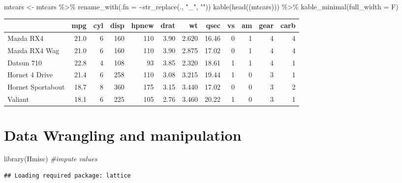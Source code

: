\documentclass[
]{book}
\newenvironment{Shaded}{\begin{snugshade}}{\end{snugshade}}
\newcommand{\AttributeTok}[1]{\textcolor[rgb]{0.77,0.63,0.00}{#1}}
\newcommand{\CommentTok}[1]{\textcolor[rgb]{0.56,0.35,0.01}{\textit{#1}}}
\newcommand{\FunctionTok}[1]{\textcolor[rgb]{0.00,0.00,0.00}{#1}}
\newcommand{\NormalTok}[1]{#1}
\newcommand{\OtherTok}[1]{\textcolor[rgb]{0.56,0.35,0.01}{#1}}
\newcommand{\SpecialCharTok}[1]{\textcolor[rgb]{0.00,0.00,0.00}{#1}}
\newcommand{\StringTok}[1]{\textcolor[rgb]{0.31,0.60,0.02}{#1}}
\begin{document}
\begin{Shaded}
\begin{Highlighting}[]
\NormalTok{mtcars }\OtherTok{\textless{}{-}}\NormalTok{ mtcars }\SpecialCharTok{\%\textgreater{}\%} \FunctionTok{rename\_with}\NormalTok{(}\AttributeTok{.fn =} \SpecialCharTok{\textasciitilde{}}\FunctionTok{str\_replace}\NormalTok{(., }\StringTok{"\_"}\NormalTok{, }\StringTok{""}\NormalTok{))}
\FunctionTok{kable}\NormalTok{(}\FunctionTok{head}\NormalTok{((mtcars))) }\SpecialCharTok{\%\textgreater{}\%} \FunctionTok{kable\_minimal}\NormalTok{(}\AttributeTok{full\_width =}\NormalTok{ F)}
\end{Highlighting}
\end{Shaded}

\begin{table}
\centering
\begin{tabular}{l|r|r|r|r|r|r|r|r|r|r|r}
\hline
  & mpg & cyl & disp & hpnew & drat & wt & qsec & vs & am & gear & carb\\
\hline
Mazda RX4 & 21.0 & 6 & 160 & 110 & 3.90 & 2.620 & 16.46 & 0 & 1 & 4 & 4\\
\hline
Mazda RX4 Wag & 21.0 & 6 & 160 & 110 & 3.90 & 2.875 & 17.02 & 0 & 1 & 4 & 4\\
\hline
Datsun 710 & 22.8 & 4 & 108 & 93 & 3.85 & 2.320 & 18.61 & 1 & 1 & 4 & 1\\
\hline
Hornet 4 Drive & 21.4 & 6 & 258 & 110 & 3.08 & 3.215 & 19.44 & 1 & 0 & 3 & 1\\
\hline
Hornet Sportabout & 18.7 & 8 & 360 & 175 & 3.15 & 3.440 & 17.02 & 0 & 0 & 3 & 2\\
\hline
Valiant & 18.1 & 6 & 225 & 105 & 2.76 & 3.460 & 20.22 & 1 & 0 & 3 & 1\\
\hline
\end{tabular}
\end{table}

\hypertarget{data-wrangling-and-manipulation}{%
\chapter{Data Wrangling and manipulation}\label{data-wrangling-and-manipulation}}

\begin{Shaded}
\begin{Highlighting}[]
\FunctionTok{library}\NormalTok{(Hmisc) }\CommentTok{\#impute values}
\end{Highlighting}
\end{Shaded}

\begin{verbatim}
## Loading required package: lattice
\end{verbatim}
\end{document}
